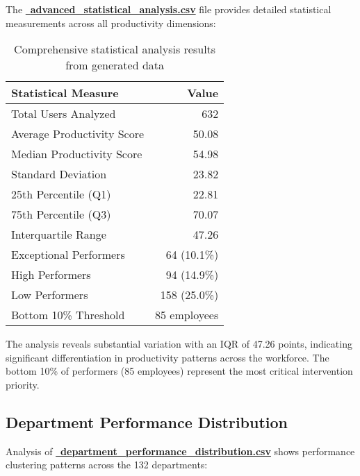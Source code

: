 \documentclass[12pt,a4paper]{article}
\begin{document}
The \textcolor{accentBlue}{\href{https://fixysaskihumorizijuv.supabase.co/storage/v1/object/public/research-files/6bc2ed7c-9918-4171-9b19-2d31fb67df5d-advanced_statistical_analysis.csv?download=}{{\normalsize\faChartLine}\, \textbf{advanced\_statistical\_analysis.csv}}} file provides detailed statistical measurements across all productivity dimensions:

\begin{table}[H]
\centering
\begin{tabular}{@{}lr@{}}
\toprule
\textbf{\color{primaryBlue}Statistical Measure} & \textbf{\color{primaryBlue}Value} \\
\midrule
Total Users Analyzed & 632 \\
Average Productivity Score & 50.08 \\
Median Productivity Score & 54.98 \\
Standard Deviation & 23.82 \\
25th Percentile (Q1) & 22.81 \\
75th Percentile (Q3) & 70.07 \\
Interquartile Range & 47.26 \\
Exceptional Performers & 64 (10.1\%) \\
High Performers & 94 (14.9\%) \\
Low Performers & 158 (25.0\%) \\
Bottom 10\% Threshold & 85 employees \\
\bottomrule
\end{tabular}
\caption{Comprehensive statistical analysis results from generated data}
\end{table}

The analysis reveals substantial variation with an IQR of 47.26 points, indicating significant differentiation in productivity patterns across the workforce. The bottom 10\% of performers (85 employees) represent the most critical intervention priority.

\subsection{Department Performance Distribution}

Analysis of \textcolor{primaryBlue}{\href{https://fixysaskihumorizijuv.supabase.co/storage/v1/object/public/research-files/61dcab8f-47f2-46f1-855f-7e95c4447bf0-department_performance_distribution.csv?download=}{{\normalsize\faSitemap}\, \textbf{department\_performance\_distribution.csv}}} shows performance clustering patterns across the 132 departments:
\end{document}

